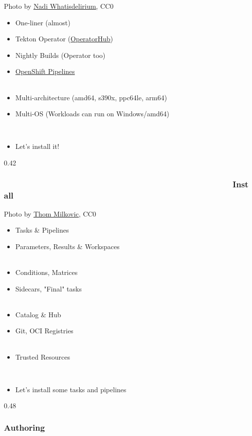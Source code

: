 \documentclass[aspectratio=169,11pt,hyperref={colorlinks=true}]{beamer}
\begin{document}

\begin{lpicrblack}{%
  Photo by \href{https://unsplash.com/@whatisdelirium}{\underline{Nadi Whatisdelirium}}, CC0
  }%
  {%
  \begin{itemize}
    \item One-liner (almost)
    \item Tekton Operator (\href{https://operatorhub.io/operator/tektoncd-operator}{\underline{OperatorHub}})
    \item Nightly Builds (Operator too) 
    \item \href{https://cloud.redhat.com/learn/topics/ci-cd}{OpenShift Pipelines} \\~
    \item Multi-architecture (amd64, s390x, ppc64le, arm64)
    \item Multi-OS (Workloads can run on Windows/amd64)
  \end{itemize}
  ~
  \begin{itemize}
    \item Let's install it!
  \end{itemize}
  }%
  {0.42}%
  \frametitle{~~~~~~~~~~~~~~~~~~~~~~~~~~~~~~~~~~~~~~~~~~~~~~~~~~Install}
\end{lpicrblack}


\begin{lgrayframerpic}{%
  Photo by \href{https://unsplash.com/@thommilkovic}{\underline{Thom Milkovic}}, CC0
  }%
  {%
  \begin{itemize}
    \item Tasks \& Pipelines \faProjectDiagram
    \item Parameters, Results \& Workspaces \\~
    \item Conditions, Matrices
    \item Sidecars, "Final" tasks \\~
    \item Catalog \& Hub \faSearch
    \item Git, OCI Registries \\~
    \item Trusted Resources \faLock
  \end{itemize}
  ~
  \begin{itemize}
    \item Let's install some tasks and pipelines
  \end{itemize}
  }%
  {0.48}
  \frametitle{Authoring}
\end{lgrayframerpic}
\end{document}

